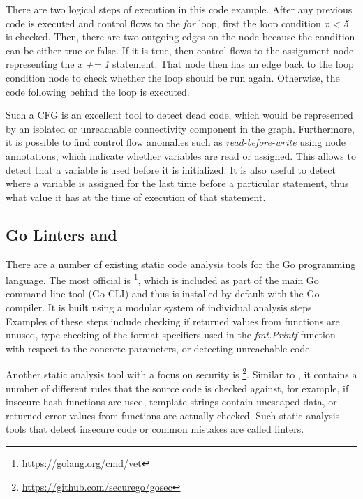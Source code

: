 

There are two logical steps of execution in this code example.
After any previous code is executed and control flows to the \textit{for} loop, first the loop condition \textit{x < 5}
is checked.
Then, there are two outgoing edges on the node because the condition can be either true or false.
If it is true, then control flows to the assignment node representing the \textit{x += 1} statement.
That node then has an edge back to the loop condition node to check whether the loop should be run again.
Otherwise, the code following behind the loop is executed.

Such a \acrshort{CFG} is an excellent tool to detect dead code, which would be represented by an isolated or unreachable
connectivity component in the graph.
Furthermore, it is possible to find control flow anomalies such as \textit{read-before-write} using node annotations,
which indicate whether variables are read or assigned.
This allows to detect that a variable is used before it is initialized.
It is also useful to detect where a variable is assigned for the last time before a particular statement, thus what
value it has at the time of execution of that statement.



\subsection{Go Linters \toolVet{} and \toolGosec{}}\label{subsec:background:static-code-analysis:linters}

There are a number of existing static code analysis tools for the Go programming language.
The most official is \toolVet{}\footnote{\url{https://golang.org/cmd/vet}}, which is included as part of the main Go
command line tool (Go \acrshort{CLI}) and thus is installed by default with the Go compiler.
It is built using a modular system of individual analysis steps.
Examples of these steps include checking if returned values from functions are unused, type checking of the format
specifiers used in the \textit{fmt.Printf} function with respect to the concrete parameters, or detecting unreachable
code.

Another static analysis tool with a focus on security is \toolGosec{}\footnote{\url{https://github.com/securego/gosec}}.
Similar to \toolVet{}, it contains a number of different rules that the source code is checked against, for example, if
insecure hash functions are used, template strings contain unescaped data, or returned error values from functions are
actually checked.
Such static analysis tools that detect insecure code or common mistakes are called linters.

